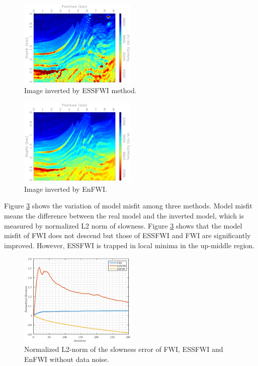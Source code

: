\documentclass[mreferee]{gji}
\begin{document}
\begin{figure}
\center
\includegraphics[width=0.5\textwidth]{fig/esfwi.pdf}
\caption{Image inverted by ESSFWI method.}
\label{fig:img_esfwi}
\end{figure}

\begin{figure}
\center
\includegraphics[width=0.5\textwidth]{fig/enfwi.pdf}
\caption{Image inverted by EnFWI. }
\label{fig:img_enfwi}
\end{figure}

Figure \ref{fig:l2norm} shows the variation of model misfit among three methods. Model misfit means the difference between the real model and the inverted model, which is measured by normalized L2 norm of slowness. Figure \ref{fig:l2norm} shows that the model misfit of FWI does not descend but those of ESSFWI and FWI are significantly improved. However, ESSFWI is trapped in local minima in the up-middle region.

\begin{figure}
\center
\includegraphics[width=0.5\textwidth]{fig/model_fit.eps}
\caption{Normalized L2-norm of the slowness error of FWI, ESSFWI and EnFWI without data noise.}
\label{fig:l2norm}
\end{figure}
\end{document}
